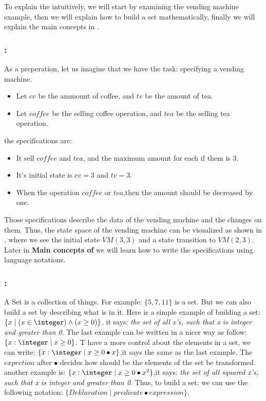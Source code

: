 To explain the \oz{} intuitively, we will start by examining the vending machine example, then we will explain how to build a set mathematically, finally we will explain the main concepts in \oz{}. 

\subsubsection{:}
As a preperation, let us imagine that we have the task: specifying a vending machine.
\begin{itemize}
\item Let $cv$ be the ammount of coffee, and $tv$ be the amount of tea.
\item Let $coffee$ be the selling coffee operation, and $tea$ be the selling tea operation.
\end{itemize}
the specifications are:
\begin{itemize}
\item It sell $coffee$ and $tea$, and the maximum amount for each if them is 3.
\item It's initial state is  $cv = 3$ and $tv = 3$.
\item When the operation $coffee$ or $tea$,then the amount should be decreased by one.
\end{itemize} 
Those specifications describe the data of the vending machine and the changes on them. Thus, the state space of the vending machine can be visualized as shown in , where we see the initial state $VM(3,3)$ and a state transition to $VM(2,3)$. Later in \textbf{Main concepts of \oz{}} we will learn how to write the specifications using \oz{} language notations.


\subsubsection{:} A Set is a collection of things. For example: $\{5, 7, 11\}$ is a set.
But we can also build a set by describing what is in it.
Here is a simple example of building a set: $\{x \mid (x \in \integer) \wedge (x \geq 0) \}$, it says: \textit{the set of all x's, such that x is integer and greater than 0}. The last example can be written in a nicer way as follow: $\{x: \integer \mid x \geq 0 \}$. T have a more control about the elements in a set, we can write: $\{x: \integer \mid x \geq 0 \bullet x\}$,it says the same as the last example. The $expretion$ after $\bullet$ decides how should be the elements of the set be transformed. another example is: $\{x: \integer \mid x \geq 0 \bullet x^{2}\}$,it says: \textit{the set of all  squared x's, such that x is integer and greater than 0}. Thus, to build a set: we can use the following notation: $\{Deklaration \mid predicate \bullet expression \}$.
	
